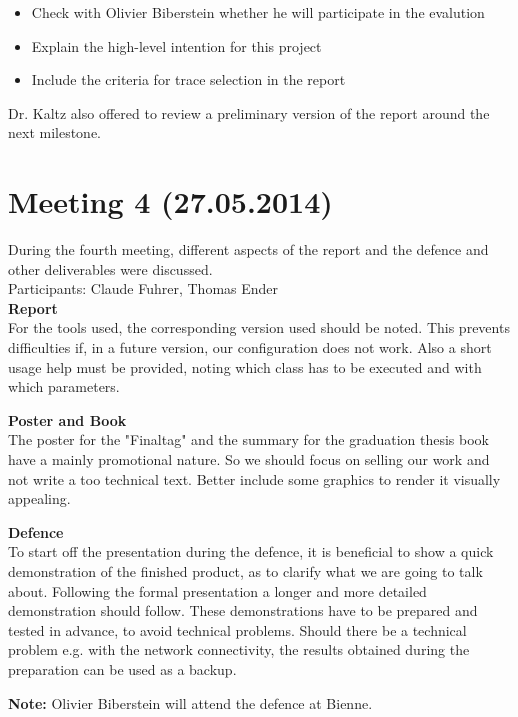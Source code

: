 \documentclass[
	a4paper,					10pt,							twoside,					openright,				notitlepage,			parskip=half,			]{scrreprt}
\begin{document}
\begin{itemize}
\item{Check with Olivier Biberstein whether he will participate in the evalution}
\item{Explain the high-level intention for this project}
\item{Include the criteria for trace selection in the report}
\end{itemize}

Dr. Kaltz also offered to review a preliminary version of the report around the next milestone.

\section*{Meeting 4 (27.05.2014)}
\label{sec:meeting_4}

During the fourth meeting, different aspects of the report and the defence and other deliverables were discussed.\\
Participants: Claude Fuhrer, Thomas Ender\\

\textbf{Report}\\
For the tools used, the corresponding version used should be noted. This prevents difficulties if, in a future version, our configuration does not work.
Also a short usage help must be provided, noting which class has to be executed and with which parameters. 

\textbf{Poster and Book}\\
The poster for the "Finaltag" and the summary for the graduation thesis book have a mainly promotional nature. So we should focus on selling our work and
not write a too technical text. Better include some graphics to render it visually appealing.

\textbf{Defence}\\
To start off the presentation during the defence, it is beneficial to show a quick demonstration of the finished product, as to clarify what we are going 
to talk about. Following the formal presentation a longer and more detailed demonstration should follow. These demonstrations have to be prepared and tested
in advance, to avoid technical problems. Should there be a technical problem e.g. with the network connectivity, the results obtained during the preparation
can be used as a backup.

\textbf{Note:} Olivier Biberstein will attend the defence at Bienne.

\clearpage{}
\clearpage{}
\end{document}
